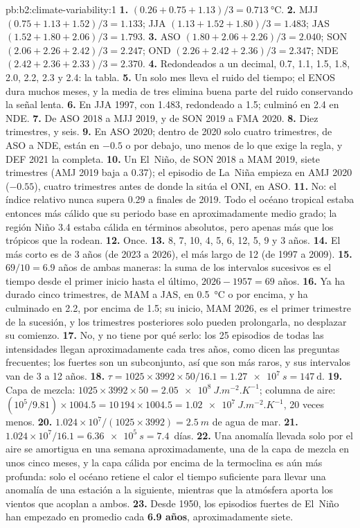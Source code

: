 \begin{solution}{pb:b2:climate-variability:1}
\textbf{1.} $(0.26 + 0.75 + 1.13)/3 = \qty{0.713}{\celsius}$.
\textbf{2.} MJJ $(0.75 + 1.13 + 1.52)/3 = 1.133$; JJA $(1.13 + 1.52 + 1.80)/3 = 1.483$; JAS $(1.52 +
1.80 + 2.06)/3 = 1.793$.
\textbf{3.} ASO $(1.80 + 2.06 + 2.26)/3 = 2.040$; SON $(2.06 + 2.26 + 2.42)/3 = 2.247$; OND $(2.26
+ 2.42 + 2.36)/3 = 2.347$; NDE $(2.42 + 2.36 + 2.33)/3 = 2.370$.
\textbf{4.} Redondeados a un decimal, 0.7, 1.1, 1.5, 1.8, 2.0, 2.2, 2.3 y 2.4: la tabla.
\textbf{5.} Un solo mes lleva el ruido del tiempo; el ENOS dura muchos meses, y la media de tres
elimina buena parte del ruido conservando la señal lenta.
\textbf{6.} En JJA 1997, con 1.483, redondeado a 1.5; culminó en 2.4 en NDE.
\textbf{7.} De ASO 2018 a MJJ 2019, y de SON 2019 a FMA 2020.
\textbf{8.} Diez trimestres, y seis.
\textbf{9.} En ASO 2020; dentro de 2020 solo cuatro trimestres, de ASO a NDE, están en $-0.5$ o por debajo, uno
menos de lo que exige la regla, y DEF 2021 la completa.
\textbf{10.} Un El~Niño, de SON 2018 a MAM 2019, siete trimestres (AMJ 2019 baja a 0.37); el
episodio de La~Niña empieza en AMJ 2020 ($-0.55$), cuatro trimestres antes de donde la sitúa el ONI, en ASO.
\textbf{11.} No: el índice relativo nunca supera 0.29 a finales de 2019. Todo el océano tropical estaba
entonces más cálido que su periodo base en aproximadamente medio grado; la región Niño 3.4 estaba cálida en
términos absolutos, pero apenas más que los trópicos que la rodean.
\textbf{12.} Once.
\textbf{13.} 8, 7, 10, 4, 5, 6, 12, 5, 9 y 3 años.
\textbf{14.} El más corto es de 3 años (de 2023 a 2026), el más largo de 12 (de 1997 a 2009).
\textbf{15.} $69/10 = 6.9$ años de ambas maneras: la suma de los intervalos sucesivos es el tiempo desde el
primer inicio hasta el último, $2026 - 1957 = 69$ años.
\textbf{16.} Ya ha durado cinco trimestres, de MAM a JAS, en \qty{0.5}{\celsius} o por encima, y
ha culminado en 2.2, por encima de 1.5; su inicio, MAM 2026, es el primer trimestre de la sucesión, y los trimestres posteriores
solo pueden prolongarla, no desplazar su comienzo.
\textbf{17.} No, y no tiene por qué serlo: los 25 episodios de todas las intensidades llegan aproximadamente cada tres años, como dicen las preguntas frecuentes;
los fuertes son un subconjunto, así que son más raros, y sus intervalos van de 3 a 12 años.
\textbf{18.} $\tau = 1025 \times 3992 \times 50/16.1 = \qty{1.27e7}{s} = \qty{147}{\day}$.
\textbf{19.} Capa de mezcla: $1025 \times 3992 \times 50 = \qty{2.05e8}{J.m^{-2}.K^{-1}}$; columna de aire:
$(10^5/9.81) \times 1004.5 = 10\,194 \times 1004.5 = \qty{1.02e7}{J.m^{-2}.K^{-1}}$, 20 veces
menos.
\textbf{20.} $1.024 \times 10^7/(1025 \times 3992) = \qty{2.5}{m}$ de agua de mar.
\textbf{21.} $1.024 \times 10^7/16.1 = \qty{6.36e5}{s} = 7.4$~días.
\textbf{22.} Una anomalía llevada solo por el aire se amortigua en una semana aproximadamente, una de la capa de mezcla en
unos cinco meses, y la capa cálida por encima de la termoclina es aún más profunda: solo el océano retiene
el calor el tiempo suficiente para llevar una anomalía de una estación a la siguiente, mientras que la atmósfera aporta
los vientos que acoplan a ambos.
\textbf{23.} Desde 1950, los episodios fuertes de El~Niño han empezado en promedio cada \textbf{6.9 años},
aproximadamente siete.
\end{solution}
